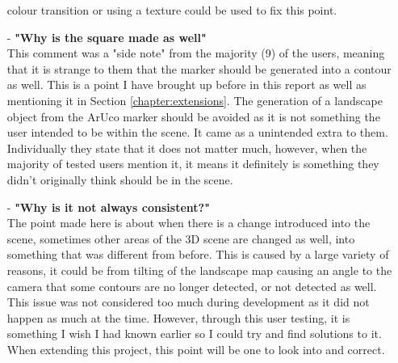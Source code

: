 \documentclass[11pt]{article}
\begin{document}
\begin{itemize}
			colour transition or using a texture could be used to fix this point.
	\item[-] \textbf{"Why is the square made as well"}\\
			This comment was a "side note" from the majority (9) of the users, meaning
			that it is strange to them that the marker should be generated into a
			contour as well. This is a point I have brought up before in 
			this report as well as mentioning
			it in Section \ref{chapter:extensions}. The generation of a landscape object 
			from the ArUco marker should be avoided as it is not something the
			user intended to be within the scene. It came as a unintended extra to them.
			Individually they state that it does not matter much, however, when the 
			majority of tested users mention it, it means it definitely is something they
			didn't originally think should be in the scene.
	\item[-] \textbf{"Why is it not always consistent?"}\\
			The point made here is about when there is a change introduced into the scene,
			sometimes other areas of the 3D scene are changed as well, into something that
			was different from before. This is caused by a large variety of reasons,
			it could be from tilting of the landscape map causing an angle to the 
			camera that some contours are no longer detected, or not detected as well. This
			issue was not considered too much during development as it did not happen 
			as much at the time. However, through this user testing, it is something I
			wish I had known earlier so I could try and find solutions to it. When extending
			this project, this point will be one to look into and correct.
\end{itemize} 
\end{document}
